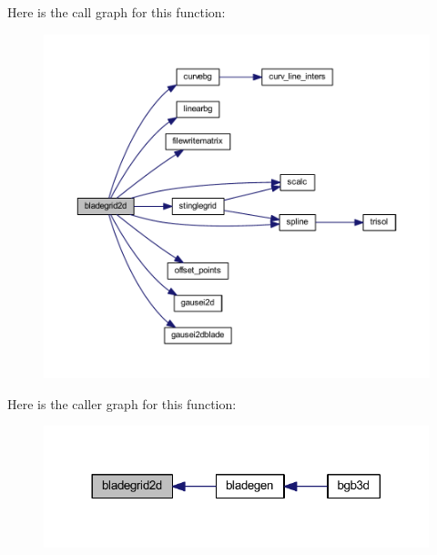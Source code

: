 Here is the call graph for this function\+:
\nopagebreak
\begin{figure}[H]
\begin{center}
\leavevmode
\includegraphics[width=350pt]{bladegrid2_d_8f90_a942de4324f4b58cfa677173c90eae2b6_cgraph}
\end{center}
\end{figure}




Here is the caller graph for this function\+:
\nopagebreak
\begin{figure}[H]
\begin{center}
\leavevmode
\includegraphics[width=317pt]{bladegrid2_d_8f90_a942de4324f4b58cfa677173c90eae2b6_icgraph}
\end{center}
\end{figure}


